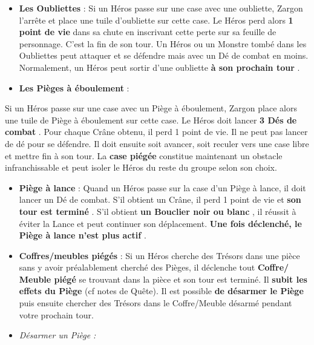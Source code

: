 \documentclass{scrartcl}%
\begin{document}
\begin{itemize}%
\item%
%
\textbf{Les Oubliettes}%
\textit{ }%
 : Si un Héros passe sur une case avec une oubliette, Zargon l'arrête et place une tuile d'oubliette sur cette case. Le Héros perd alors %
\textbf{1 point de vie}%
\textit{ }%
 dans sa chute en inscrivant cette perte sur sa feuille de personnage. C'est la fin de son tour. Un Héros ou un Monstre tombé dans les Oubliettes peut attaquer et se défendre mais avec un Dé de combat en moins. Normalement, un Héros peut sortir d'une oubliette%
\textbf{ à son prochain tour}%
.
%
\item%
%
\textbf{Les Pièges à éboulement}%
\textit{ }%
 :
%
\end{itemize}%
Si un Héros passe sur une case avec un Piège à éboulement, Zargon place alors une tuile de Piège à éboulement sur cette case. Le Héros doit lancer %
\textbf{3 Dés de combat}%
. Pour chaque Crâne obtenu, il perd 1 point de vie. Il ne peut pas lancer de dé pour se défendre. Il doit ensuite soit avancer, soit reculer vers une case libre et mettre fin à son tour. La %
\textbf{case piégée}%
\textit{ }%
 constitue maintenant un obstacle infranchissable et peut isoler le Héros du reste du groupe selon son choix.
%
\begin{itemize}%
\item%
%
\textbf{Piège à lance}%
: Quand un Héros passe sur la case d'un Piège à lance, il doit lancer un Dé de combat. S'il obtient un Crâne, il perd 1 point de vie et %
\textbf{son tour est terminé}%
. S'il obtient %
\textbf{un Bouclier noir ou blanc}%
, il réussit à éviter la Lance et peut continuer son déplacement.%
\textbf{ Une fois déclenché, le Piège à lance n'est plus actif}%
.
%
\item%
%
\textbf{Coffres/meubles piégés}%
: Si un Héros cherche des Trésors dans une pièce sans y avoir préalablement cherché des Pièges, il déclenche tout %
\textbf{Coffre/ Meuble piégé}%
\textit{ }%
 se trouvant dans la pièce et son tour est terminé. Il %
\textbf{subit les effets du Piège }%
(cf notes de Quête). Il est possible %
\textbf{de désarmer le Piège}%
\textit{ }%
 puis ensuite chercher des Trésors dans le Coffre/Meuble désarmé pendant votre prochain tour.
%
\item%
%
\textit{Désarmer un Piège}%
\textit{ :
}%
\end{itemize}%
\end{document}
